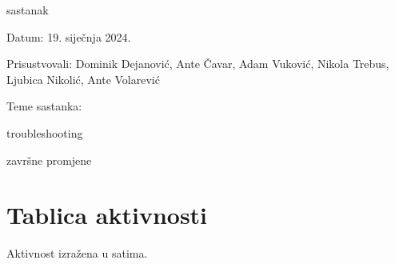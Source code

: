 \begin{packed_enum}
            \item  sastanak
            \item[] \begin{packed_item}
                \item Datum: 19. siječnja 2024.
                \item Prisustvovali: Dominik Dejanović, Ante Čavar, Adam Vuković, Nikola Trebus, Ljubica Nikolić, Ante Volarević
                \item Teme sastanka:
                \begin{packed_item}
                    \item troubleshooting
                    \item završne promjene
                \end{packed_item}
            \end{packed_item}
			
			
		\end{packed_enum}
		
		\eject
		\section*{Tablica aktivnosti}
		
			Aktivnost izražena u satima.

